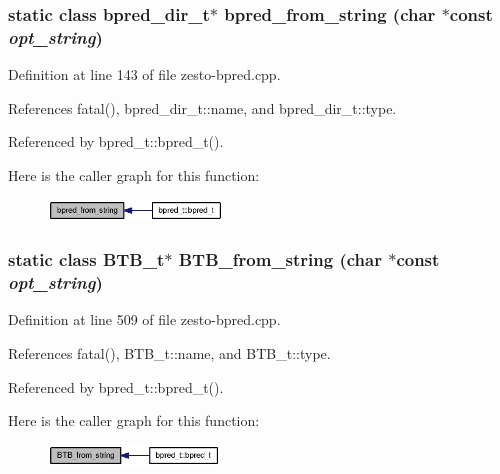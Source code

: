 \subsubsection[{bpred\_\-from\_\-string}]{\setlength{\rightskip}{0pt plus 5cm}static class {\bf bpred\_\-dir\_\-t}$\ast$ bpred\_\-from\_\-string (char $\ast$const  {\em opt\_\-string})\hspace{0.3cm}{\tt  [static]}}\label{zesto-bpred_8cpp_9b817c1ef51d785664e22a8fe6719984}




Definition at line 143 of file zesto-bpred.cpp.

References fatal(), bpred\_\-dir\_\-t::name, and bpred\_\-dir\_\-t::type.

Referenced by bpred\_\-t::bpred\_\-t().

Here is the caller graph for this function:\nopagebreak
\begin{figure}[H]
\begin{center}
\leavevmode
\includegraphics[width=131pt]{zesto-bpred_8cpp_9b817c1ef51d785664e22a8fe6719984_icgraph}
\end{center}
\end{figure}
\subsubsection[{BTB\_\-from\_\-string}]{\setlength{\rightskip}{0pt plus 5cm}static class {\bf BTB\_\-t}$\ast$ BTB\_\-from\_\-string (char $\ast$const  {\em opt\_\-string})\hspace{0.3cm}{\tt  [static]}}\label{zesto-bpred_8cpp_b696223f60d5a0a77d27019e4576e018}




Definition at line 509 of file zesto-bpred.cpp.

References fatal(), BTB\_\-t::name, and BTB\_\-t::type.

Referenced by bpred\_\-t::bpred\_\-t().

Here is the caller graph for this function:\nopagebreak
\begin{figure}[H]
\begin{center}
\leavevmode
\includegraphics[width=129pt]{zesto-bpred_8cpp_b696223f60d5a0a77d27019e4576e018_icgraph}
\end{center}
\end{figure}
